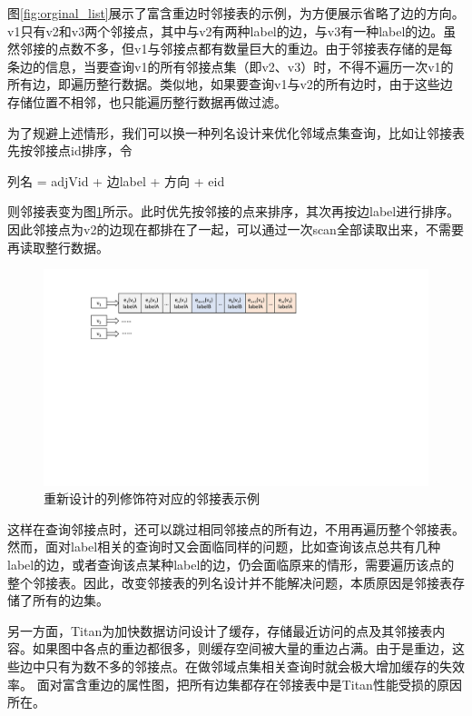 图\ref{fig:orginal_list}展示了富含重边时邻接表的示例，为方便展示省略了边的方向。v1只有v2和v3两个邻接点，其中与v2有两种label的边，与v3有一种label的边。虽然邻接的点数不多，但v1与邻接点都有数量巨大的重边。由于邻接表存储的是每条边的信息，当要查询v1的所有邻接点集（即v2、v3）时，不得不遍历一次v1的所有边，即遍历整行数据。类似地，如果要查询v1与v2的所有边时，由于这些边存储位置不相邻，也只能遍历整行数据再做过滤。

为了规避上述情形，我们可以换一种列名设计来优化邻域点集查询，比如让邻接表先按邻接点id排序，令
\begin{center}
  列名 = adjVid + 边label + 方向 + eid
\end{center}
则邻接表变为图\ref{fig:redesign_list}所示。此时优先按邻接的点来排序，其次再按边label进行排序。因此邻接点为v2的边现在都排在了一起，可以通过一次scan全部读取出来，不需要再读取整行数据。

\begin{figure}[htbp]
\centering
\includegraphics[width=150mm]{fig/redesign_list.pdf}
\caption{重新设计的列修饰符对应的邻接表示例}
\label{fig:redesign_list}
\end{figure}

这样在查询邻接点时，还可以跳过相同邻接点的所有边，不用再遍历整个邻接表。然而，面对label相关的查询时又会面临同样的问题，比如查询该点总共有几种label的边，或者查询该点某种label的边，仍会面临原来的情形，需要遍历该点的整个邻接表。因此，改变邻接表的列名设计并不能解决问题，本质原因是邻接表存储了所有的边集。

另一方面，Titan为加快数据访问设计了缓存，存储最近访问的点及其邻接表内容。如果图中各点的重边都很多，则缓存空间被大量的重边占满。由于是重边，这些边中只有为数不多的邻接点。在做邻域点集相关查询时就会极大增加缓存的失效率。
面对富含重边的属性图，把所有边集都存在邻接表中是Titan性能受损的原因所在。

